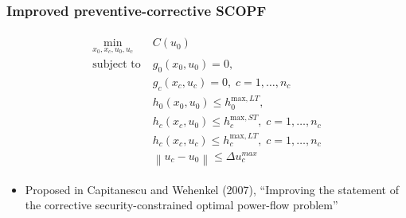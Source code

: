 \documentclass[compress]{beamer}
\newcommand\norm[1]{\left\lVert#1\right\rVert}
\begin{document}
\begin{frame}
  \frametitle{Improved preventive-corrective SCOPF}
  \begin{align}
  \tag{PC-SCOPF}
    \begin{split}
    \min_{x_0,x_c,u_0,u_c} \; & C(u_0) \\
    \text{subject to} \; & g_0(x_0,u_0) = 0, \; \\
    & g_c(x_c,u_c) = 0, \; c = 1,\ldots,n_c \\
    & h_0(x_0,u_0) \leq h_0^{\text{max},LT}, \\
    & h_c(x_c,u_0) \leq h_c^{\text{max},ST}, \; c = 1,\ldots,n_c \\
    & h_c(x_c,u_c) \leq h_c^{\text{max},LT}, \; c = 1,\ldots,n_c \\
    & \norm{u_c - u_0} \leq \Delta u_c^{max}
    \end{split}
  \end{align}
  \begin{itemize}
  \item Proposed in Capitanescu and Wehenkel (2007), ``Improving the statement of the corrective security-constrained optimal power-flow problem''
  \end{itemize}
\end{frame}
\end{document}
